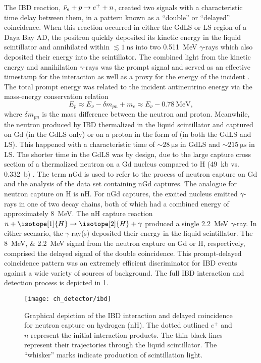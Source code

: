 The IBD reaction, $\bar{\nu}_e + p \to e^+ + n$,
created two signals with a characteristic
time delay between them, in a pattern known as a ``double''
or ``delayed'' coincidence.
When this reaction occurred in either the GdLS or LS region
of a Daya Bay AD,
the positron quickly deposited its kinetic energy in the liquid scintillator
and annihilated within $\lesssim\SI{1}{\nano\second}$
into two \SI{0.511}{\MeV} $\gamma$-rays
which also deposited their energy into the scintillator.
The combined light from the kinetic energy and annihilation $\gamma$-rays
was the prompt signal
and served as an effective timestamp for the interaction
as well as a proxy for the energy of the incident \nuebar{}.
The total prompt energy was related to the incident antineutrino energy
via the mass-energy conservation relation
\begin{equation}\label{eq:prompt_vs_nu_energy}
    E_p \approx E_\nu - \delta m_{pn} + m_e \approx E_\nu - \SI{0.78}{\MeV},
\end{equation}
where $\delta m_{pn}$ is the mass difference between the neutron and proton.
Meanwhile, the neutron produced by IBD thermalized in the liquid scintillator
and captured on Gd (in the GdLS only) or on a proton in the form of 
(in both the GdLS and LS).
This happened with a characteristic time of $\sim \SI{28}{\micro\second}$
in GdLS and $\sim \SI{215}{\micro\second}$ in LS.
The shorter time in the GdLS was by design,
due to the large capture cross section of a thermalized neutron
on a Gd nucleus compared to H (\SI{49}{\kilo\barn} vs. \SI{0.332}{\barn})
\cite{gdls2014}.
The term nGd is used to refer to the process of neutron capture on Gd
and the analysis of the data set containing nGd captures.
The analogue for neutron capture on H is nH.
For nGd captures, the excited nucleus
emitted $\gamma$-rays in one of two decay chains,
both of which had a combined energy of approximately \SI{8}{\MeV}.
The nH capture reaction $n+\isotope[1]{H} \to \isotope[2]{H} + \gamma$
produced a single \SI{2.2}{\MeV} $\gamma$-ray.
In either scenario, the $\gamma$-ray(s) deposited their energy
in the liquid scintillator.
The \SIlist[list-pair-separator = { or }]{8;2.2}{\MeV} signal
from the neutron capture on Gd or H, respectively, comprised the delayed signal of the
double coincidence.
This prompt-delayed coincidence pattern was an extremely efficient
discriminator for IBD events against a wide variety of sources of background.
The full IBD interaction and detection process
is depicted in \cref{fig:ibd_cartoon}.

\begin{figure}
    \centering
    \texttt{[image: ch\_detector/ibd]}
    \caption[Inverse Beta Decay diagram]{
        Graphical depiction of the IBD interaction and delayed coincidence
        for neutron capture on hydrogen (nH).
        The dotted outlined $e^+$ and $n$ represent the initial interaction products.
        The thin black lines represent their trajectories
        through the liquid scintillator.
        The ``whisker'' marks indicate production of scintillation light.
    }
    \label{fig:ibd_cartoon}
\end{figure}

